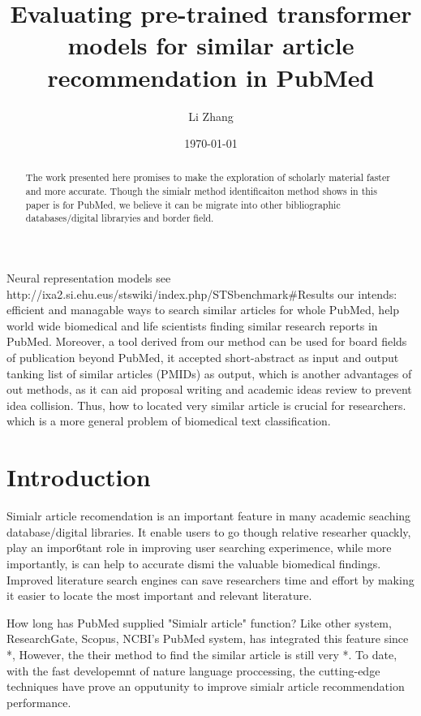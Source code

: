 \documentclass[11pt]{article}
\title{Evaluating pre-trained transformer models for similar article recommendation in PubMed}
\author{Li Zhang}
\date{\today}
\begin{document}
    \maketitle

    \begin{abstract}
        The work presented here promises to make the exploration of scholarly material faster and more accurate.
        Though the simialr method identificaiton method shows in this paper is for PubMed, we believe it can be migrate into other bibliographic databases/digital libraryies and border field.
    \end{abstract}

    \newpage

    Neural representation models  see http://ixa2.si.ehu.eus/stswiki/index.php/STSbenchmark#Results
    our intends: efficient and managable ways to search similar articles for whole PubMed, help world wide biomedical and life scientists finding similar research reports in PubMed.
    Moreover, a tool derived from our method can be used for board fields of publication beyond PubMed, it accepted short-abstract as input and output tanking list of similar articles (PMIDs) as output,
    which is another advantages of out methods, as it can aid proposal writing and academic ideas review to prevent idea collision.
    Thus, how to located very similar article is crucial for researchers. which is a more general problem of biomedical text classification.





    \section{Introduction}
    Simialr article recomendation is an important feature in many academic seaching database/digital libraries. It enable users to go though relative researher quackly, play an impor6tant role in improving user searching experimence, while more importantly, is can help to accurate dismi the valuable biomedical findings.
    Improved literature search engines can save researchers time and effort by making it easier to locate the most important and relevant literature. \cite{2006Text}

    How long has PubMed supplied "Simialr article" function?
    Like other system, ResearchGate, Scopus, NCBI's PubMed system, has integrated this feature since *, However, the their method to find the similar article is still very *. To date, with the fast developemnt of
    nature language proccessing, the cutting-edge techniques have prove an opputunity to improve simialr article recommendation performance.
\end{document}
